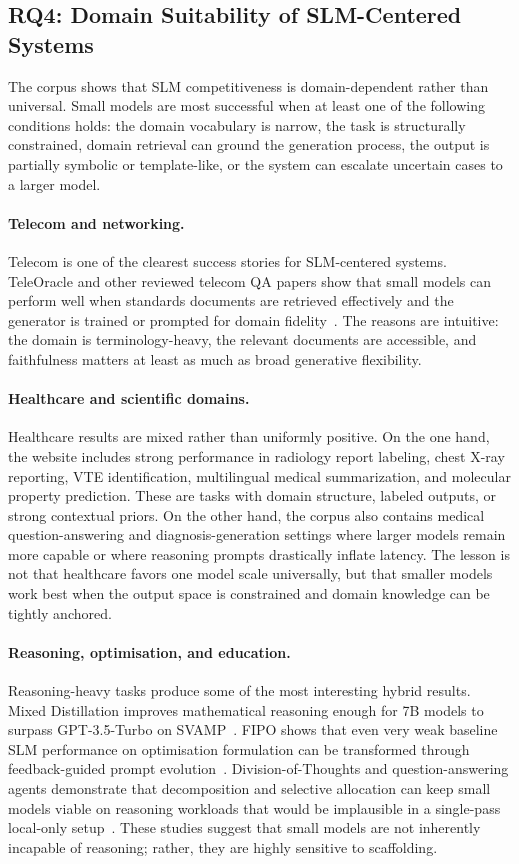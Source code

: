 \subsection{RQ4: Domain Suitability of SLM-Centered Systems}
The corpus shows that SLM competitiveness is domain-dependent rather than universal. Small models are most successful when at least one of the following conditions holds: the domain vocabulary is narrow, the task is structurally constrained, domain retrieval can ground the generation process, the output is partially symbolic or template-like, or the system can escalate uncertain cases to a larger model.

\paragraph{Telecom and networking.}
Telecom is one of the clearest success stories for SLM-centered systems. TeleOracle and other reviewed telecom QA papers show that small models can perform well when standards documents are retrieved effectively and the generator is trained or prompted for domain fidelity~\cite{alabbasi2024teleoracle}. The reasons are intuitive: the domain is terminology-heavy, the relevant documents are accessible, and faithfulness matters at least as much as broad generative flexibility.

\paragraph{Healthcare and scientific domains.}
Healthcare results are mixed rather than uniformly positive. On the one hand, the website includes strong performance in radiology report labeling, chest X-ray reporting, VTE identification, multilingual medical summarization, and molecular property prediction. These are tasks with domain structure, labeled outputs, or strong contextual priors. On the other hand, the corpus also contains medical question-answering and diagnosis-generation settings where larger models remain more capable or where reasoning prompts drastically inflate latency. The lesson is not that healthcare favors one model scale universally, but that smaller models work best when the output space is constrained and domain knowledge can be tightly anchored.

\paragraph{Reasoning, optimisation, and education.}
Reasoning-heavy tasks produce some of the most interesting hybrid results. Mixed Distillation improves mathematical reasoning enough for 7B models to surpass GPT-3.5-Turbo on SVAMP~\cite{li2024mixed}. FIPO shows that even very weak baseline SLM performance on optimisation formulation can be transformed through feedback-guided prompt evolution~\cite{amarasinghe2025fipo}. Division-of-Thoughts and question-answering agents demonstrate that decomposition and selective allocation can keep small models viable on reasoning workloads that would be implausible in a single-pass local-only setup~\cite{shao2025dot}. These studies suggest that small models are not inherently incapable of reasoning; rather, they are highly sensitive to scaffolding.

